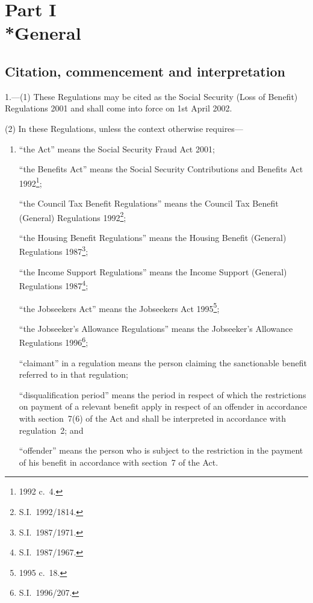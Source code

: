 \documentclass[12pt,a4paper]{article}
\begin{document}
\bigskip

\setcounter{secnumdepth}{-2}

\section[Part I --- General]{Part I\\*General}

\renewcommand\parthead{--- Part I}

\subsection[1. Citation, commencement and interpretation]{Citation, commencement and interpretation}

1.---(1)  These Regulations may be cited as the Social Security (Loss of Benefit) Regulations 2001 and shall come into force on 1st April 2002.

(2) In these Regulations, unless the context otherwise requires—
\begin{enumerate}\item[]
“the Act” means the Social Security Fraud Act 2001;

“the Benefits Act” means the Social Security Contributions and Benefits Act 1992\footnote{1992 c.~4.};

“the Council Tax Benefit Regulations” means the Council Tax Benefit (General) Regulations 1992\footnote{S.I.~1992/1814.};

“the Housing Benefit Regulations” means the Housing Benefit (General) Regulations 1987\footnote{S.I.~1987/1971.};

“the Income Support Regulations” means the Income Support (General) Regulations 1987\footnote{S.I.~1987/1967.};

“the Jobseekers Act” means the Jobseekers Act 1995\footnote{1995 c.~18.};

“the Jobseeker’s Allowance Regulations” means the Jobseeker’s Allowance Regulations 1996\footnote{S.I.~1996/207.};

“claimant” in a regulation means the person claiming the sanctionable benefit referred to in that regulation;

“disqualification period” means the period in respect of which the restrictions on payment of a relevant benefit apply in respect of an offender in accordance with section~7(6) of the Act and shall be interpreted in accordance with regulation~2; and

“offender” means the person who is subject to the restriction in the payment of his benefit in accordance with section~7 of the Act.
\end{enumerate}
\end{document}
